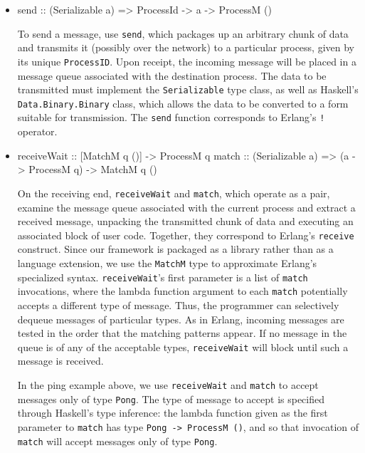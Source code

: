 \documentclass[preprint]{sigplanconf}
\begin{document}
\begin{itemize}
\item 
\begin{code}
send :: (Serializable a) => ProcessId -> a -> ProcessM ()
\end{code}

To send a message, use \texttt{send}, which packages up an arbitrary chunk of data and transmits it (possibly over the network) to a particular process, given by its unique \texttt{ProcessID}. Upon receipt, the incoming message will be placed in a message queue associated with the destination process. The data to be transmitted must implement the \texttt{Serializable} type class, as well as Haskell's \texttt{Data.Binary.Binary} class, which allows the data to be converted to a form suitable for transmission. The \texttt{send} function corresponds to Erlang's \texttt{!} operator.

\item 
\begin{code}
receiveWait :: [MatchM q ()] -> ProcessM q
match :: (Serializable a) => (a -> ProcessM q) -> MatchM q ()
\end{code}

On the receiving end, \texttt{receiveWait} and \texttt{match}, which operate as a pair, examine the message queue associated with the current process and extract a received message, unpacking the transmitted chunk of data and executing an associated block of user code. Together, they correspond to Erlang's \texttt{receive} construct. Since our framework is packaged as a library rather than as a language extension, we use the \texttt{MatchM} type to approximate Erlang's specialized syntax. \texttt{receiveWait}'s first parameter is a list of \texttt{match} invocations, where the lambda function argument to each \texttt{match} potentially accepts a different type of message. Thus, the programmer can selectively dequeue messages of particular types. As in Erlang, incoming messages are tested in the order that the matching patterns appear. If no message in the queue is of any of the acceptable types, \texttt{receiveWait} will block until such a message is received. %

In the ping example above, we use \texttt{receiveWait} and \texttt{match} to accept messages only of type \texttt{Pong}. The type of message to accept is specified through Haskell's type inference: the lambda function given as the first parameter to \texttt{match} has type \lstinline!Pong -> ProcessM ()!, and so that invocation of \texttt{match} will accept messages only of type \texttt{Pong}.
\end{itemize}
\end{document}
